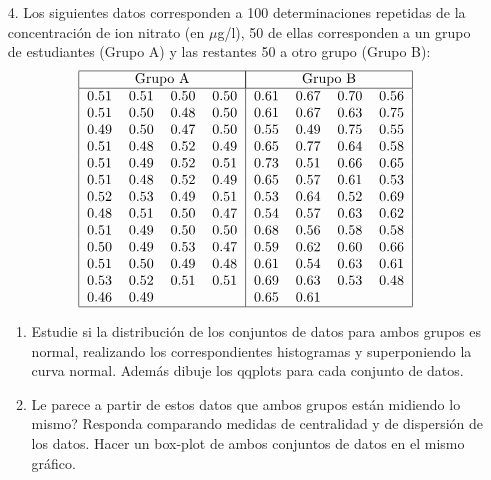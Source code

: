 \documentclass[11pt,a4paper,twoside]{article}%
\begin{document}
\begin{enumerate}
\begin{enumerate}
\end{enumerate}

\item[4.] Los siguientes datos corresponden a 100 determinaciones repetidas de
la concentraci\'{o}n de ion nitrato (en $\mu$g/l), 50 de ellas corresponden a
un grupo de estudiantes (Grupo A) y las restantes 50 a otro grupo (Grupo B):%
\[%
\begin{tabular}
[c]{|cccc|cccc|}\hline
\multicolumn{4}{|c|}{Grupo A} & \multicolumn{4}{|c|}{Grupo B}\\\hline
0.51 & 0.51 & 0.50 & 0.50 & 0.61 & 0.67 & 0.70 & 0.56\\
0.51 & 0.50 & 0.48 & 0.50 & 0.61 & 0.67 & 0.63 & 0.75\\
0.49 & 0.50 & 0.47 & 0.50 & 0.55 & 0.49 & 0.75 & 0.55\\
0.51 & 0.48 & 0.52 & 0.49 & 0.65 & 0.77 & 0.64 & 0.58\\
0.51 & 0.49 & 0.52 & 0.51 & 0.73 & 0.51 & 0.66 & 0.65\\
0.51 & 0.48 & 0.52 & 0.49 & 0.65 & 0.57 & 0.61 & 0.53\\
0.52 & 0.53 & 0.49 & 0.51 & 0.53 & 0.64 & 0.52 & 0.69\\
0.48 & 0.51 & 0.50 & 0.47 & 0.54 & 0.57 & 0.63 & 0.62\\
0.51 & 0.49 & 0.50 & 0.50 & 0.68 & 0.56 & 0.58 & 0.58\\
0.50 & 0.49 & 0.53 & 0.47 & 0.59 & 0.62 & 0.60 & 0.66\\
0.51 & 0.50 & 0.49 & 0.48 & 0.61 & 0.54 & 0.63 & 0.61\\
0.53 & 0.52 & 0.51 & 0.51 & 0.69 & 0.63 & 0.53 & 0.48\\
0.46 & 0.49 &  &  & 0.65 & 0.61 &  & \\\hline
\end{tabular}
\
\]


\begin{enumerate}
\item Estudie si la distribuci\'{o}n de los conjuntos de datos para ambos
grupos es normal, realizando los correspondientes histogramas y superponiendo
la curva normal. Adem\'{a}s dibuje los qqplots para cada conjunto de datos.

\item \textquestiondown Le parece a partir de estos datos que ambos grupos
est\'{a}n midiendo lo mismo? Responda comparando medidas de centralidad y de
dispersi\'{o}n de los datos. Hacer un box-plot de ambos conjuntos de datos en
el mismo gr\'{a}fico.
\end{enumerate}


\end{enumerate}
\end{document}
